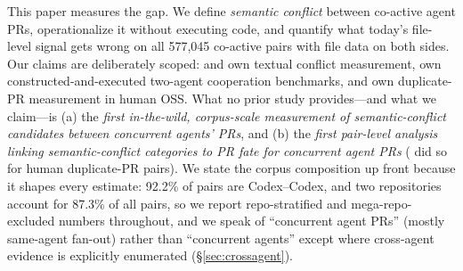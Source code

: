 \documentclass{article}
\begin{document}
This paper measures the gap. We define \emph{semantic conflict} between co-active agent PRs, operationalize it without executing code, and quantify what today's file-level signal gets wrong on all 577{,}045 co-active pairs with file data on both sides. %
Our claims are deliberately scoped: \citet{xu2026agentprs} and \citet{agenticflict} own textual conflict measurement, \citet{cooperbench} own constructed-and-executed two-agent cooperation benchmarks, and \citet{duppr} own duplicate-PR measurement in human OSS. What no prior study provides---and what we claim---is (a) the \emph{first in-the-wild, corpus-scale measurement of semantic-conflict candidates between concurrent agents' PRs}, and (b) the \emph{first pair-level analysis linking semantic-conflict categories to PR fate for concurrent agent PRs} (\citet{li2022duplicates} did so for human duplicate-PR pairs). We state the corpus composition up front because it shapes every estimate: 92.2\% of pairs are Codex--Codex, and two repositories account for 87.3\% of all pairs, %
so we report repo-stratified and mega-repo-excluded numbers throughout, and we speak of ``concurrent agent PRs'' (mostly same-agent fan-out) rather than ``concurrent agents'' except where cross-agent evidence is explicitly enumerated (\S\ref{sec:crossagent}).
\end{document}
